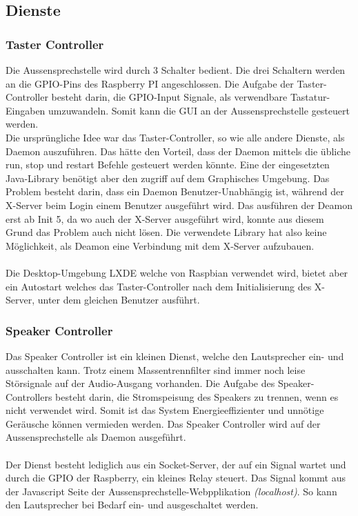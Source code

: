 \subsection{Dienste}
\label{kap:dienste}

\subsubsection{Taster Controller}
Die Aussensprechstelle wird durch 3 Schalter bedient. Die drei Schaltern werden an die GPIO-Pins des Raspberry PI angeschlossen. Die Aufgabe der Taster-Controller besteht darin, die GPIO-Input Signale, als verwendbare Tastatur-Eingaben umzuwandeln. Somit kann die GUI an der Aussensprechstelle gesteuert werden.
\\
Die ursprüngliche Idee war das Taster-Controller, so wie alle andere Dienste, als Daemon auszuführen. Das hätte den Vorteil, dass der Daemon mittels die übliche run, stop und restart Befehle gesteuert werden könnte. Eine der eingesetzten Java-Library benötigt aber den zugriff auf dem Graphisches Umgebung. Das Problem besteht darin, dass ein Daemon Benutzer-Unabhängig ist, während der X-Server beim Login einem Benutzer ausgeführt wird. Das ausführen der Deamon erst ab Init 5, da wo auch der X-Server ausgeführt wird, konnte aus diesem Grund das Problem auch nicht lösen.
Die verwendete Library hat also keine Möglichkeit, als Deamon eine Verbindung mit dem X-Server aufzubauen.
\\\\
Die Desktop-Umgebung LXDE welche von Raspbian verwendet wird, bietet aber ein Autostart welches das Taster-Controller nach dem Initialisierung des X-Server, unter dem gleichen Benutzer ausführt.

\subsubsection{Speaker Controller}
Das Speaker Controller ist ein kleinen Dienst, welche den Lautsprecher ein- und ausschalten kann. Trotz einem Massentrennfilter sind immer noch leise Störsignale auf der Audio-Ausgang vorhanden.
Die Aufgabe des Speaker-Controllers besteht darin, die Stromspeisung des Speakers zu trennen, wenn es nicht verwendet wird. Somit ist das System Energieeffizienter und unnötige Geräusche können vermieden werden. Das Speaker Controller wird auf der Aussensprechstelle als Daemon ausgeführt.
\\
\\
Der Dienst besteht lediglich aus ein Socket-Server, der auf ein Signal wartet und durch die GPIO der Raspberry, ein kleines Relay steuert.
Das Signal kommt aus der Javascript Seite der Aussensprechstelle-Webpplikation \textit{(localhost)}. So kann den Lautsprecher bei Bedarf ein- und ausgeschaltet werden.

